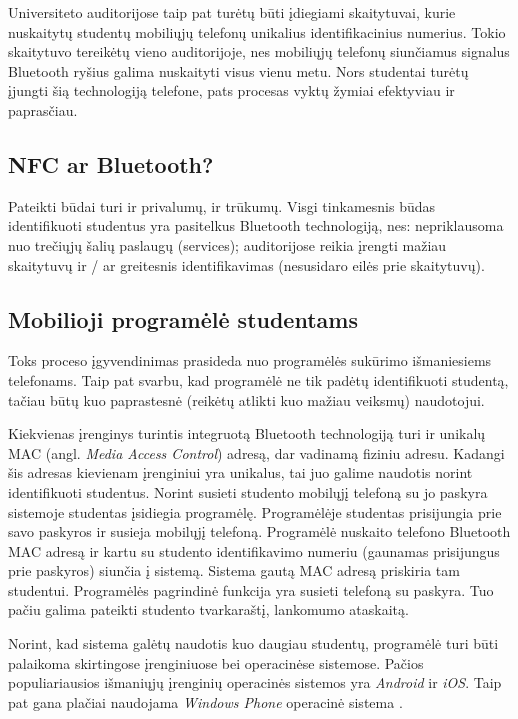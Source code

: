 \documentclass{VUMIFPSkursinis}
\begin{document}
Universiteto auditorijose taip pat turėtų būti įdiegiami skaitytuvai, kurie nuskaitytų studentų mobiliųjų telefonų unikalius identifikacinius numerius. Tokio skaitytuvo tereikėtų vieno auditorijoje, nes mobiliųjų telefonų siunčiamus signalus Bluetooth ryšius galima nuskaityti visus vienu metu. Nors studentai turėtų įjungti šią technologiją telefone, pats procesas vyktų žymiai efektyviau ir paprasčiau.

\subsection{NFC ar Bluetooth?}
Pateikti būdai turi ir privalumų, ir trūkumų. Visgi tinkamesnis būdas identifikuoti studentus yra pasitelkus Bluetooth technologiją, nes: nepriklausoma nuo trečiųjų šalių paslaugų (services); auditorijose reikia įrengti mažiau skaitytuvų ir / ar greitesnis identifikavimas (nesusidaro eilės prie skaitytuvų).

\subsection{Mobilioji programėlė studentams} \label{StudentApp}
Toks proceso įgyvendinimas prasideda nuo programėlės sukūrimo išmaniesiems telefonams. Taip pat svarbu, kad programėlė ne tik padėtų identifikuoti studentą, tačiau būtų kuo paprastesnė (reikėtų atlikti kuo mažiau veiksmų) naudotojui.

Kiekvienas įrenginys turintis integruotą Bluetooth technologiją turi ir unikalų MAC (angl. \textit{Media Access Control}) adresą, dar vadinamą fiziniu adresu. Kadangi šis adresas kievienam įrenginiui yra unikalus, tai juo galime naudotis norint identifikuoti studentus. Norint susieti studento mobilųjį telefoną su jo paskyra sistemoje studentas įsidiegia programėlę. Programėlėje studentas prisijungia prie savo paskyros ir susieja mobilųjį telefoną. Programėlė nuskaito telefono Bluetooth MAC adresą ir kartu su studento identifikavimo numeriu (gaunamas prisijungus prie paskyros) siunčia į sistemą. Sistema gautą MAC adresą priskiria tam studentui. Programėlės pagrindinė funkcija yra susieti telefoną su paskyra. Tuo pačiu galima pateikti studento tvarkaraštį, lankomumo ataskaitą.

Norint, kad sistema galėtų naudotis kuo daugiau studentų, programėlė turi būti palaikoma skirtingose įrenginiuose bei operacinėse sistemose. Pačios populiariausios išmaniųjų įrenginių operacinės sistemos yra \textit{Android} ir \textit{iOS}. Taip pat gana plačiai naudojama \textit{Windows Phone} operacinė sistema \cite{MarketShareByOS}.
\end{document}
